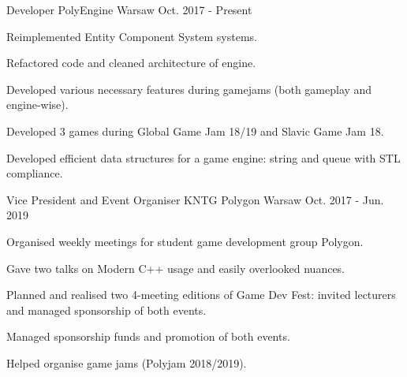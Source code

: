 \begin{cventries}
    \cventry
    {Developer} %
    {PolyEngine} %
    {Warsaw}
    {Oct. 2017 - Present} %
    {
      \begin{cvitems} %
        \item {Reimplemented Entity Component System systems.}
        \item {Refactored code and cleaned architecture of engine.}
        \item {Developed various necessary features during gamejams (both gameplay and engine-wise).}
        \item {Developed 3 games during Global Game Jam 18/19 and Slavic Game Jam 18.}
        \item {Developed efficient data structures for a game engine: string and queue with STL compliance.}
      \end{cvitems}
    }
    \cventry
    {Vice President and Event Organiser} %
    {KNTG Polygon} %
    {Warsaw} %
    {Oct. 2017 - Jun. 2019} %
    {
      \begin{cvitems} %
        \item {Organised weekly meetings for student game development group Polygon.}
        \item {Gave two talks on Modern C++ usage and easily overlooked nuances.}
        \item {Planned and realised two 4-meeting editions of Game Dev Fest: invited lecturers and managed sponsorship of both events.}
        \item {Managed sponsorship funds and promotion of both events.}
        \item {Helped organise game jams (Polyjam 2018/2019).}
      \end{cvitems}
    }



\end{cventries}
